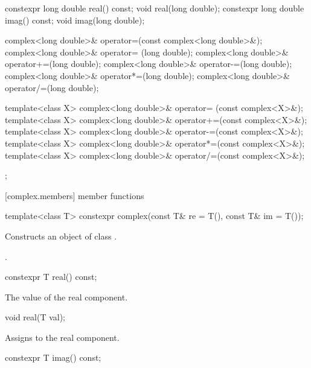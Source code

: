 \begin{codeblock}
{{    constexpr long double real() const;
    void real(long double);
    constexpr long double imag() const;
    void imag(long double);

    complex<long double>& operator=(const complex<long double>&);
    complex<long double>& operator= (long double);
    complex<long double>& operator+=(long double);
    complex<long double>& operator-=(long double);
    complex<long double>& operator*=(long double);
    complex<long double>& operator/=(long double);

    template<class X> complex<long double>& operator= (const complex<X>&);
    template<class X> complex<long double>& operator+=(const complex<X>&);
    template<class X> complex<long double>& operator-=(const complex<X>&);
    template<class X> complex<long double>& operator*=(const complex<X>&);
    template<class X> complex<long double>& operator/=(const complex<X>&);
  };
}
\end{codeblock}

[complex.members]{ member functions}

%
\begin{itemdecl}
template<class T> constexpr complex(const T& re = T(), const T& im = T());
\end{itemdecl}

\begin{itemdescr}
\pnum
\effects
Constructs an object of class
.

\pnum
\postconditions
{}.
\end{itemdescr}

%
\begin{itemdecl}
constexpr T real() const;
\end{itemdecl}

\begin{itemdescr}
\pnum
\returns The value of the real component.
\end{itemdescr}

%
\begin{itemdecl}
void real(T val);
\end{itemdecl}

\begin{itemdescr}
\pnum
\effects Assigns  to the real component.
\end{itemdescr}

%
\begin{itemdecl}
constexpr T imag() const;
\end{itemdecl}

